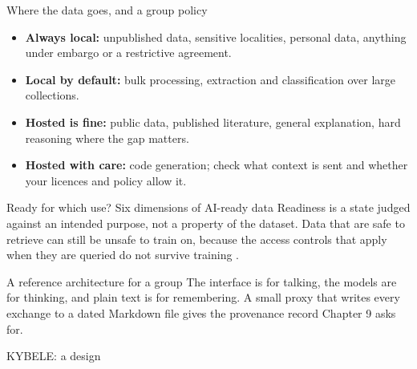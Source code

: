 \documentclass[11pt,aspectratio=169]{beamer}
\begin{document}
\begin{frame}{Where the data goes, and a group policy}
  \begingroup{}\endgroup
  \begin{itemize}\small
    \item \textbf{Always local:} unpublished data, sensitive localities,
      personal data, anything under embargo or a restrictive agreement.
    \item \textbf{Local by default:} bulk processing, extraction and
      classification over large collections.
    \item \textbf{Hosted is fine:} public data, published literature,
      general explanation, hard reasoning where the gap matters.
    \item \textbf{Hosted with care:} code generation; check what context is
      sent and whether your licences and policy allow it.
  \end{itemize}
\end{frame}

\begin{frame}{Ready for which use? Six dimensions of AI-ready data}
  \begingroup{}\endgroup
  \footnotesize
  Readiness is a state judged against an intended purpose, not a property of
  the dataset. Data that are safe to retrieve can still be unsafe to train on,
  because the access controls that apply when they are queried do not survive
  training \parencite{legner2026aireadydata}.
\end{frame}

\begin{frame}{A reference architecture for a group}
  \begingroup{}\endgroup
  The interface is for talking, the models are for thinking, and plain text
  is for remembering. A small proxy that writes every exchange to a dated
  Markdown file gives the provenance record Chapter 9 asks for.
\end{frame}

\begin{frame}{KYBELE: a design}
  \begingroup{}\endgroup
\end{frame}
\end{document}

